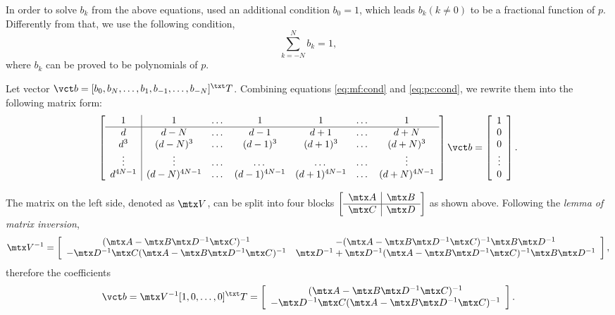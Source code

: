 In order to solve $b_k$ from the above equations,
\cite{thiran1971recursive} used an additional condition $b_0=1$,
which leads $b_k(k\neq 0)$ to be a fractional function of $p$.
Differently from that, we use the following condition,
\begin{equation}\label{eq:pc:cond}
\sum_{k=-N}^N b_k =1,
\end{equation}
where $b_k$ can be proved to be polynomials of $p$.

Let vector $\vct b=[b_0,b_N,\dots,b_1,b_{-1},\dots,b_{-N}]^\txt T$.
Combining equations \ref{eq:mf:cond} and \ref{eq:pc:cond},
we rewrite them into the following matrix form:
\[
\left[\begin{array}{c|cccccc}
1 & 1 & \dots & 1 & 1 & \dots & 1 \\ \hline
d & d-N &\dots &d-1 & d+1 &\dots & d+N \\
d^3 & (d-N)^3 & \dots & (d-1)^3 & (d+1)^3 &\dots & (d+N)^3 \\
\vdots & \vdots &\dots &\dots &\dots &\dots &\vdots \\
d^{4N-1} & (d-N)^{4N-1} & \dots & (d-1)^{4N-1} 
& (d+1)^{4N-1} &\dots & (d+N)^{4N-1}
\end{array}\right]\vct b=
\left[\begin{array}{c}
1 \\ 0 \\ 0 \\ \vdots \\ 0
\end{array}\right].
\]

The matrix on the left side, denoted as $\mtx V$, 
can be split into four blocks
$\left[\begin{array}{c|c}
\mtx A & \mtx B \\ \hline  \mtx C & \mtx D
\end{array}\right]$ 
as shown above.
Following the \textit{lemma of matrix inversion},
\begin{equation}
\mtx V^{-1}=\left[\begin{array}{cc}
(\mtx A-\mtx B\mtx D^{-1}\mtx C)^{-1} &
-(\mtx A-\mtx B\mtx D^{-1}\mtx C)^{-1}\mtx B\mtx D^{-1} \\
-\mtx D^{-1}\mtx C(\mtx A-\mtx B\mtx D^{-1}\mtx C)^{-1} &
\mtx D^{-1}+\mtx D^{-1}(\mtx A-\mtx B\mtx D^{-1}\mtx C)^{-1}\mtx B\mtx D^{-1} \\
\end{array}\right],
\end{equation}
therefore the coefficients
\begin{equation}\label{eq:sltn}
\vct b=\mtx V^{-1}[1,0,\dots,0]^\txt T=
\left[\begin{array}{c}
(\mtx A-\mtx B\mtx D^{-1}\mtx C)^{-1} \\
-\mtx D^{-1}\mtx C(\mtx A-\mtx B\mtx D^{-1}\mtx C)^{-1} 
\end{array}\right].
\end{equation}

